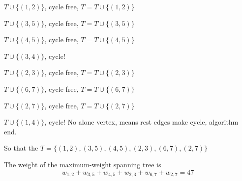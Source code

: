 \documentclass{article}
\begin{document}
{{        \begin{enumerate}{
            \item \(\mathit{T} \cup \{ (1,2) \} \), cycle free, \(\mathit{T} = \mathit{T} \cup \{ (1,2) \} \)
            \item \(\mathit{T} \cup \{ (3,5) \} \), cycle free, \(\mathit{T} = \mathit{T} \cup \{ (3,5) \} \)
            \item \(\mathit{T} \cup \{ (4,5) \} \), cycle free, \(\mathit{T} = \mathit{T} \cup \{ (4,5) \} \)
            \item \(\mathit{T} \cup \{ (3,4) \} \), cycle!
            \item \(\mathit{T} \cup \{ (2,3) \} \), cycle free, \(\mathit{T} = \mathit{T} \cup \{ (2,3) \} \)
            \item \(\mathit{T} \cup \{ (6,7) \} \), cycle free, \(\mathit{T} = \mathit{T} \cup \{ (6,7) \} \)
            \item \(\mathit{T} \cup \{ (2,7) \} \), cycle free, \(\mathit{T} = \mathit{T} \cup \{ (2,7) \} \)
            \item \(\mathit{T} \cup \{ (1,4) \} \), cycle! No alone vertex, means rest edges make cycle, algorithm end.
        }
        \end{enumerate}
        So that the \(\mathit{T} = \{ (1,2), (3,5), (4,5), (2,3), (6,7), (2,7)\} \)

        The weight of the maximum-weight spanning tree is
        \[\mathit{w}_{1,2}+\mathit{w}_{3,5}+\mathit{w}_{4,5}+\mathit{w}_{2,3}+\mathit{w}_{6,7}+\mathit{w}_{2,7} = 47\]
    }
}
\end{document}
